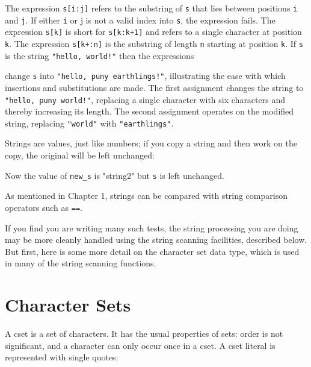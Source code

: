 \bigskip

The expression \texttt{s[i:j]} refers to the
substring of \texttt{s} that lies between positions
\texttt{i} and \texttt{j}. If either \texttt{i} or j is not a valid
index into \texttt{s}, the expression fails. The expression
\texttt{s[k]} is short for \texttt{s[k:k+1]} and refers to a single
character at position \texttt{k}. The expression
\texttt{s[k+:n]} is the substring of length \texttt{n} starting at
position \texttt{k}. If \texttt{s} is the string
\texttt{"hello, world!"} then the
expressions


\noindent
change \texttt{s} into \texttt{"hello, puny
earthlings!"}, illustrating the ease with which
insertions and substitutions are made. The first assignment changes the
string to \texttt{"hello, puny world!"},
replacing a single character with six characters and thereby increasing
its length. The second assignment operates on the modified string,
replacing \texttt{"world"} with
\texttt{"earthlings"}.

Strings are values, just like numbers; if you copy a string and then
work on the copy, the original will be left unchanged:


Now the value of \texttt{new\_s} is
"string2" but \texttt{s} is left unchanged.

As mentioned in Chapter 1, strings can be compared with string
comparison operators such as
\texttt{==}.


If you find you are writing many such tests, the string processing you
are doing may be more cleanly handled using the string scanning
facilities, described below. But first, here is some more detail on the
character set data type, which is used in many of the string scanning
functions.

\section{Character Sets}

A cset is a set of characters. It has the usual properties of sets:
order is not significant, and a character can only occur once in a
cset. A cset literal is represented with single
quotes:

